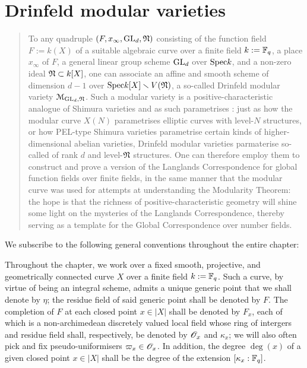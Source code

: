 \chapter{Drinfeld modular varieties}
    \begin{abstract}
        To any quadruple $(F, x_{\infty}, \operatorname{GL}_d, \mathfrak{N})$ consisting of the function field $F := k(X)$ of a suitable algebraic curve over a finite field $k := \mathbb{F}_q$, a place $x_{\infty}$ of $F$, a general linear group scheme $\operatorname{GL}_d$ over $\mathrm{Spec} k$, and a non-zero ideal $\mathfrak{N} \subset k[X]$, one can associate an affine and smooth scheme of dimension $d - 1$ over $\mathrm{Spec} k[X] \smallsetminus V(\mathfrak{N})$, a so-called Drinfeld modular variety $\mathcal{M}_{\operatorname{GL}_d, \mathfrak{N}}$. Such a modular variety is a positive-characteristic analogue of Shimura varieties and as such parametrises : just as how the modular curve $X(N)$ parametrises elliptic curves with level-$N$ structures, or how PEL-type Shimura varieties parametrise certain kinds of higher-dimensional abelian varieties, Drinfeld modular varieties parmaterise so-called  of rank $d$ and level-$\mathfrak{N}$ structures. One can therefore employ them to construct and prove a version of the Langlands Correspondence for global function fields over finite fields, in the same manner that the modular curve was used for attempts at understanding the Modularity Theorem: the hope is that the richness of positive-characteristic geometry will shine some light on the mysteries of the Langlands Correspondence, thereby serving as a template for the Global Correspondence over number fields. 
    \end{abstract}
    
    We subscribe to the following general conventions throughout the entire chapter:
    \begin{convention}
        Throughout the chapter, we work over a fixed smooth, projective, and geometrically connected curve $X$ over a finite field $k := \mathbb{F}_q$. Such a curve, by virtue of being an integral scheme, admits a unique generic point that we shall denote by $\eta$; the residue field of said generic point shall be denoted by $F$. The completion of $F$ at each closed point $x \in |X|$ shall be denoted by $F_x$, each of which is a non-archimedean discretely valued local field whose ring of intergers and residue field shall, respectively, be denoted by $\mathscr{O}_x$ and $\kappa_x$; we will also often pick and fix pseudo-uniformisers $\varpi_x \in \mathscr{O}_x$. In addition, the degree $\deg(x)$ of a given closed point $x \in |X|$ shall be the degree of the extension $[\kappa_x : \mathbb{F}_q]$.  
    \end{convention}
    
